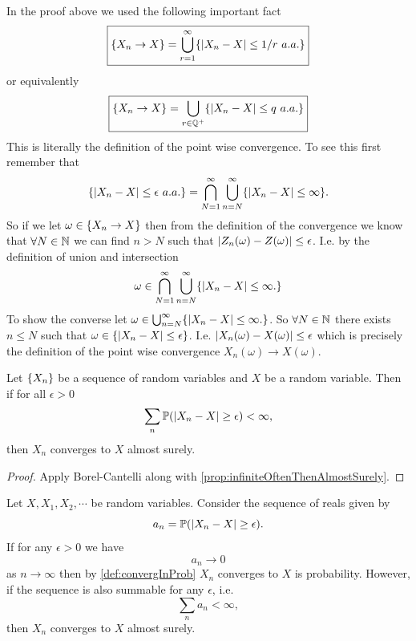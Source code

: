 \begin{remark}[Important!]
	In the proof above we used the following important fact
	\[ \boxed{\{X_n \to X\} = \bigcup_{r=1}^{\infty} \{|X_n-X|\leq 1/r\ a.a.\}} \]
	or equivalently
	\[ \boxed{\{X_n \to X\} = \bigcup_{r\in\mathbb{Q}^+} \{|X_n-X|\leq q\ a.a.\}} \]
	This is literally the definition of the point wise convergence. To see this first remember that
	\[ \{|X_n-X|\leq \epsilon\ a.a.\} = \bigcap_{N=1}^\infty \bigcup_{n=N}^{\infty}\{|X_n - X| \leq \infty \}. \]
	So if we let $ \omega \in \{X_n \to X\} $ then from the definition of the convergence we know that $ \forall N \in \mathbb{N} $ we can find $ n>N $ such that $ |Z_n(\omega) - Z(\omega)| \leq \epsilon $. I.e. by the definition of union and intersection
	\[ \omega \in \bigcap_{N=1}^\infty \bigcup_{n=N}^{\infty}\{|X_n - X| \leq \infty. \} \]
	To show the converse let $ \omega \in \bigcup_{n=N}^{\infty}\{|X_n - X| \leq \infty. \} $. So $ \forall N \in \mathbb{N} $ there exists $ n\leq N $ such that $ \omega \in \{|X_n - X|\leq \epsilon\} $. I.e. $ |X_n(\omega) - X(\omega)| \leq \epsilon  $
	which is precisely the definition of the point wise convergence $ X_n(\omega) \to X(\omega)$.
\end{remark}

\begin{corollary}
	Let $ \{X_n\} $ be a sequence of random variables and $ X $ be a random variable. Then if for all $ \epsilon>0 $
	\[ \sum_n \mathbb{P}(|X_n-X|\geq \epsilon) < \infty, \]
	then $ X_n $ converges to $ X $ almost surely.
\end{corollary}
\begin{proof}
	Apply Borel-Cantelli along with \autoref{prop:infiniteOftenThenAlmostSurely}.
\end{proof}

\begin{summary}
	\label{sum:ConvergenceInPropVsAlmsotSure}
	Let $ X,X_1,X_2,\cdots $ be random variables. Consider the sequence of reals given by
	\[ a_n =  \mathbb{P}(|X_n - X|\geq \epsilon). \]
	If for any $ \epsilon>0 $ we have
	\[ a_n \to 0 \]
	as $ n\to\infty $ then by \autoref{def:convergInProb} $ X_n $ converges to $ X $ is probability. However, if the sequence is also summable for any $ \epsilon $, i.e.
	\[ \sum_n a_n < \infty, \]
	then $ X_n $ converges to $ X $ almost surely.
\end{summary}





